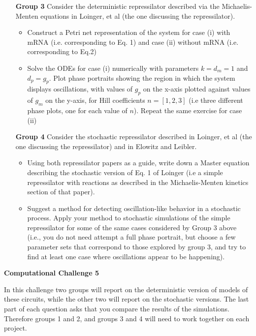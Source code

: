 \documentclass[12pt]{article}
\begin{document}
\begin{enumerate}
\item[\bf Group 3] Consider the deterministic repressilator described via the Michaelis-Menten equations in Loinger, et al (the one discussing the repressilator).
\begin{itemize}
\item Construct a Petri net representation of the system for case (i) with mRNA (i.e. corresponding to Eq. 1) and case (ii) without mRNA (i.e. corresponding to Eq.2)
\item  Solve the ODEs for case (i) numerically with parameters $k=d_m=1$ and $d_p=g_p$. Plot phase portraits showing the region in which the system displays oscillations, with values of $g_p$ on the x-axis plotted against values of $g_m$ on the y-axis, for Hill coefficients $n=[1,2,3]$ (i.e three different phase plots, one for each value of $n$). Repeat the same exercise for case (ii) 
\end{itemize}

\item[\bf Group 4] Consider the stochastic repressilator described in Loinger, et al (the one discussing the repressilator) and in Elowitz and Leibler.
\begin{itemize}
\item Using both repressilator papers as a guide, write down a Master equation describing the stochastic version of Eq. 1 of Loinger (i.e a simple repressilator with reactions as described in the Michaelis-Menten kinetics section of that paper).
\item Suggest a method for detecting oscillation-like behavior in a stochastic process. Apply your method to stochastic simulations of the simple repressilator for some of the same cases considered by Group 3 above (i.e., you do not need attempt a full phase portrait, but choose a few parameter sets that correspond to those explored by group 3, and try to find at least one case where oscillations appear to be happening).
\end{itemize}

\end{enumerate}


\begin{center}
{\Large \bf Computational Challenge 5
\\ \vskip5mm }
\end{center}


In this challenge two groups will report on the deterministic version of models of these circuits, while the other two
will report on the stochastic versions. The last part of each question asks that you 
compare the results of the simulations. Therefore groups 1 and 2, and groups 3 and 4 will
need to work together on each project.
\end{document}
